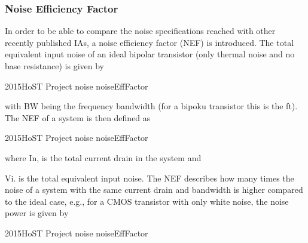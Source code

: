 	\subsubsection{Noise Efficiency Factor}
	In order to be able to compare the noise specifications
reached with other recently published IAs, a noise efficiency factor (NEF) is introduced. The total equivalent
input noise of an ideal bipolar transistor (only thermal
noise and no base resistance) is given by

2015HoST Project noise noiseEffFactor

with BW being the frequency bandwidth (for a bipoku
transistor this is the ft). The NEF of a system is then
defined as

2015HoST Project noise noiseEffFactor

where In, is the total current drain in the system and

Vi. is the total equivalent input noise. The NEF describes how many times the noise of a system with the
same current drain and bandwidth is higher compared to
the ideal case, e.g., for a CMOS transistor with only white
noise, the noise power is given by

2015HoST Project noise noiseEffFactor

  